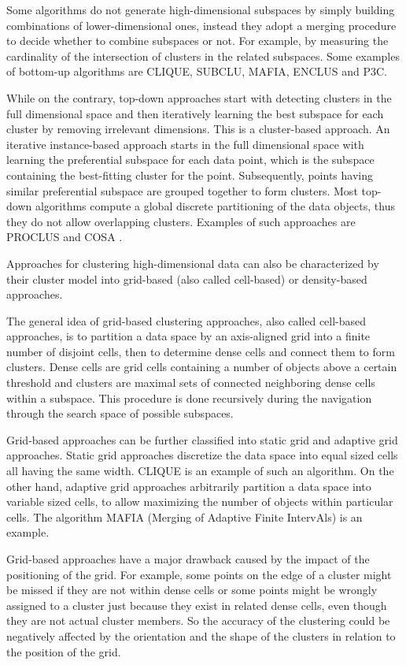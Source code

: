 Some algorithms do not generate high-dimensional subspaces by simply building combinations of lower-dimensional ones, instead they adopt a merging procedure to decide whether to combine subspaces or not. For example, by measuring the cardinality of the intersection of clusters in the related subspaces. Some examples of bottom-up algorithms are CLIQUE, SUBCLU, MAFIA, ENCLUS and P3C.
 
While on the contrary, top-down approaches start with detecting clusters in the full dimensional space and then iteratively learning the best subspace for each cluster by removing irrelevant dimensions. This is a cluster-based approach. An iterative instance-based approach starts in the full dimensional space with learning the preferential subspace for each data point, which is the subspace containing the best-fitting cluster for the point. Subsequently, points having similar preferential subspace are grouped together to form clusters. Most top-down algorithms compute a global discrete partitioning of the data objects, thus they do not allow overlapping clusters. Examples of such approaches are PROCLUS and COSA \citep{RePEc:bla:jorssb:v:66:y:2004:i:4:p:815-849}.

Approaches for clustering high-dimensional data can also be characterized by their cluster model into grid-based (also called cell-based) or density-based approaches.

The general idea of grid-based clustering approaches, also called cell-based approaches, is to partition a data space by an axis-aligned grid into a finite number of disjoint cells, then to determine dense cells and connect them to form clusters. Dense cells are grid cells containing a number of objects above a certain threshold and clusters are maximal sets of connected neighboring dense cells within a subspace. This procedure is done recursively during the navigation through the search space of possible subspaces.

Grid-based approaches can be further classified into static grid and adaptive grid approaches. Static grid approaches discretize the data space into equal sized cells all having the same width. CLIQUE is an example of such an algorithm. On the other hand, adaptive grid approaches arbitrarily partition a data space into variable sized cells, to allow maximizing the number of objects within particular cells. The algorithm MAFIA (Merging of Adaptive Finite IntervAls) is an example.

Grid-based approaches have a major drawback caused by the impact of the positioning of the grid. For example, some points on the edge of a cluster might be missed if they are not within dense cells or some points might be wrongly assigned to a cluster just because they exist in related dense cells, even though they are not actual cluster members. So the accuracy of the clustering could be negatively affected by the orientation and the shape of the clusters in relation to the position of the grid.

